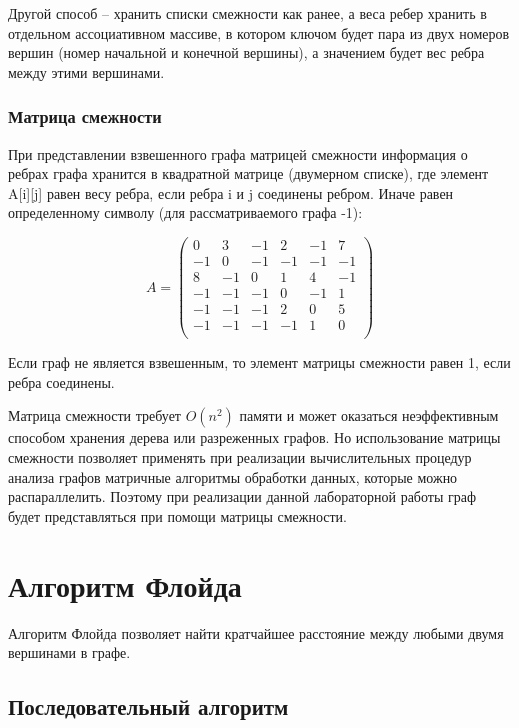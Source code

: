 Другой способ – хранить списки смежности как ранее, а веса ребер хранить в отдельном ассоциативном массиве, в котором ключом будет пара из двух номеров вершин (номер начальной и конечной вершины), а значением будет вес ребра между этими вершинами.

\subsubsection{Матрица смежности}

При представлении взвешенного графа матрицей смежности информация о ребрах графа хранится в квадратной матрице (двумерном списке), где элемент A[i][j] равен весу ребра, если ребра i и j соединены ребром.  Иначе равен определенному символу (для рассматриваемого графа -1):

\begin{equation}
	A = \begin{pmatrix}
		0 & 3 & -1 & 2 & -1 & 7\\
		-1 & 0 & -1 & -1 & -1 & -1\\
		8 & -1 & 0 & 1 & 4 & -1\\
		-1 & -1 & -1 & 0 & -1 & 1\\
		-1 & -1 & -1 & 2 & 0 & 5\\
		-1 & -1 & -1 & -1 & 1 & 0\\
	\end{pmatrix}
\end{equation}

Если граф не является взвешенным, то элемент матрицы смежности равен 1, если ребра соединены.

Матрица смежности требует $O(n^2)$ памяти и может оказаться неэффективным способом хранения дерева или разреженных графов. Но использование матрицы смежности позволяет применять при реализации вычислительных процедур анализа графов матричные
алгоритмы обработки данных, которые можно распараллелить. Поэтому при реализации данной лабораторной работы граф будет представляться при помощи матрицы смежности.

\section{Алгоритм Флойда}

Алгоритм Флойда \cite{alg} позволяет найти кратчайшее расстояние между любыми двумя вершинами в графе.

\subsection{Последовательный алгоритм}

